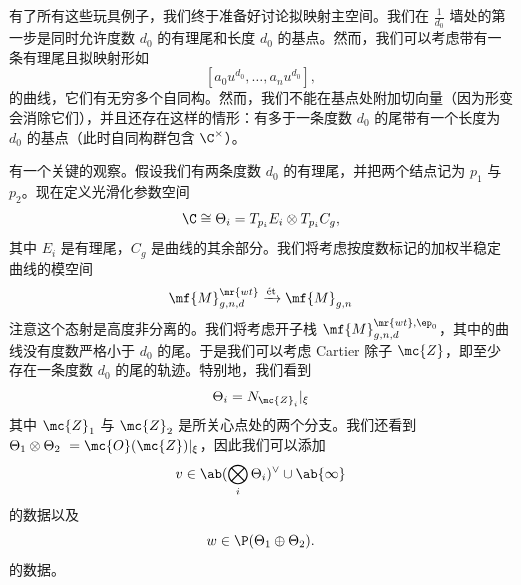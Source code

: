 有了所有这些玩具例子，我们终于准备好讨论拟映射主空间。我们在 \(\frac{1}{d_0}\) 墙处的第一步是同时允许度数 \(d_0\) 的有理尾和长度 \(d_0\) 的基点。然而，我们可以考虑带有一条有理尾且拟映射形如
\[ [a_0 u^{d_0}, \ldots, a_n u^{d_0}], \]
的曲线，它们有无穷多个自同构。然而，我们不能在基点处附加切向量（因为形变会消除它们），并且还存在这样的情形：有多于一条度数 \(d_0\) 的尾带有一个长度为 \(d_0\) 的基点（此时自同构群包含 \(\C^{\times}\)）。

\begin{rmk}
    有一个关键的观察。假设我们有两条度数 \(d_0\) 的有理尾，并把两个结点记为 \(p_1\) 与 \(p_2\)。现在定义光滑化参数空间
    \[ \C \cong \Theta_i = T_{p_i} E_i \otimes T_{p_i} C_g, \]
    其中 \(E_i\) 是有理尾，\(C_g\) 是曲线的其余部分。我们将考虑按度数标记的加权半稳定曲线的模空间
    \[ \mf{M}_{g,n,d}^{\mr{wt}} \xrightarrow{\text{\'et}} \mf{M}_{g,n} \]
    注意这个态射是高度非分离的。我们将考虑开子栈 \(\mf{M}_{g,n,d}^{\mr{wt}, \ep_0}\)，其中的曲线没有度数严格小于 \(d_0\) 的尾。于是我们可以考虑 Cartier 除子 \(\mc{Z}\)，即至少存在一条度数 \(d_0\) 的尾的轨迹。特别地，我们看到
    \[ \Theta_i = N_{\mc{Z}_i} |_{\xi} \]
    其中 \(\mc{Z}_1\) 与 \(\mc{Z}_2\) 是所关心点处的两个分支。我们还看到 \(\Theta_1 \otimes \Theta_2\ = \mc{O}(\mc{Z})|_{\xi}\)，因此我们可以添加
    \[ v \in \ab(\bigotimes_i \Theta_i)^{\vee} \cup \ab\{\infty\} \]
    的数据以及 
    \[ w \in \P(\Theta_1 \oplus\Theta_2). \]
    的数据。
\end{rmk}

